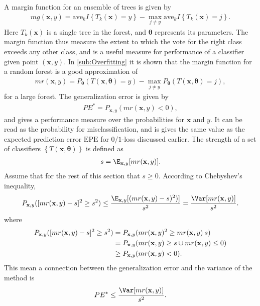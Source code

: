 A margin function for an ensemble of trees is given by
\begin{align}
  mg(\mathbf{x}, y) = \mathrm{ave}_k I\left\{ T_k(\mathbf{x}) = y \right\} - 
  \max_{j \neq y} \mathrm{ave}_k I\left\{ T_k(\mathbf{x}) = j \right\}.
\end{align}
Here $T_k(\mathbf{x})$ is a single tree in the forest, and $\bm \theta$ represents its parameters. 
The margin function thus measure the extent to which the vote for the right class exceeds any other class, and is a useful measure for performance of a classifier given point $(\mathbf{x}, y)$.  
In \ref{sub:Overfitting} it is shown that the margin function for a random forest is a good approximation of
\begin{align}
  mr(\mathbf{x}, y) = P_{\bm \theta} (T(\mathbf{x}, \bm \theta) = y) - \max_{j \neq y} P_{\bm \theta}(T(\mathbf{x}, \bm \theta) = j), 
\end{align}
for a large forest. The generalization error is given by
\begin{align}
  PE^* = P_{\mathbf{x}, y}(mr(\mathbf{x}, y) < 0),
\end{align}
and gives a performance measure over the probabilities for $\mathbf{x}$ and $y$. It can be read as the probability for misclassification, and is gives the same value as the expected prediction error $\mathrm{EPE}$ for $0/1$-loss discussed earlier. 
The strength of a set of classifiers $\left\{ T(\mathbf{x}, \bm \theta) \right\}$ is defined as
\begin{align}
  s = \E_{\mathbf{x}, y} [mr(\mathbf{x}, y)]. 
\end{align}
Assume that for the rest of this section that $s \geq 0$.  
According to Chebyshev's inequality,
\begin{align}
  P_{\mathbf{x}, y} ([mr(\mathbf{x}, y)-s]^2 \geq s^2) \leq 
  \frac{\E_{\mathbf{x},y}[(mr(\mathbf{x}, y) - s)^2)]}{s^2} =
  \frac{\Var[mr(\mathbf{x}, y)]}{s^2}.
\end{align}
where
\begin{align}
  P_{\mathbf{x}, y} ([mr(\mathbf{x}, y)-s]^2 \geq s^2)
  &= P_{\mathbf{x}, y} (mr(\mathbf{x}, y)^2 \geq mr(\mathbf{x}, y)\: s) \notag \\
  &= P_{\mathbf{x}, y} (mr(\mathbf{x}, y) \geq s  \cup mr(\mathbf{x}, y) \leq 0) \notag \\
  & \geq P_{\mathbf{x}, y} (mr(\mathbf{x}, y) < 0).
\end{align}
This mean a connection between the generalization error and the variance of the method is
\begin{align}
  \label{eq:PEVar} 
  PE^* \leq  \frac{\Var[mr(\mathbf{x}, y)]}{s^2}.
\end{align}
